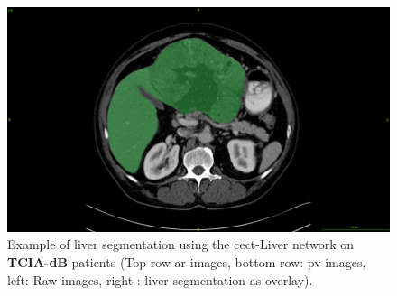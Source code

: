 \documentclass[]{article}
\newcommand{\pplfont}[1]{{\fontfamily{ppl}\selectfont #1}}
\newcommand{\lmttfont}[1]{{\fontfamily{lmtt}\selectfont #1}}
\begin{document}
\begin{figure}[ht!]
\begin{minipage}{0.45\linewidth}
	\end{minipage}
	\hspace{0.3cm}
	\begin{minipage}{0.45\linewidth}
		\includegraphics[width=0.9\linewidth]{../HistologicalGradePrediction/images/ResizeTCIA_CECTLiver_prediction_TCGA-DD-A11A_slice42_greenLiver}
	\end{minipage}
	\caption{Example of liver segmentation using the \pplfont{\ac{cect}-Liver} network on \textbf{\lmttfont{TCIA-dB}}
	patients (Top row \ac{ar} images, bottom row: \ac{pv} images, left:
	Raw images, right : liver segmentation as overlay).}
	\label{fig:LiverPredTciaDb}
\end{figure}
\end{document}

